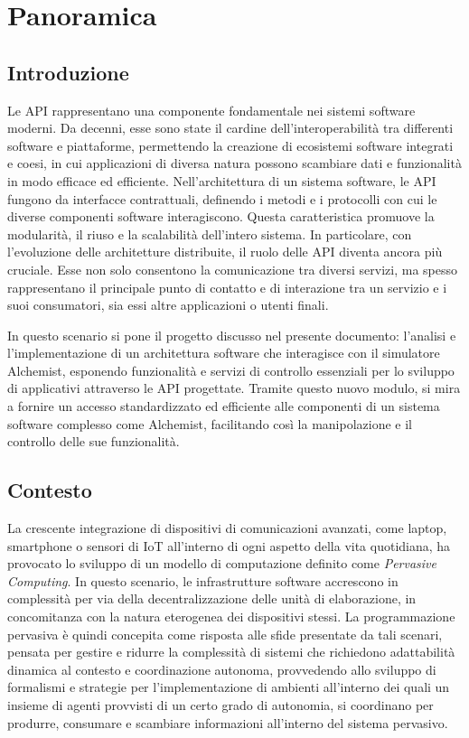 \chapter{Panoramica}\label{chap:introduction}
\section{Introduzione}\label{sec:background}
Le \ac{API} rappresentano una componente fondamentale nei sistemi software moderni. Da decenni, esse sono state il cardine dell'interoperabilità tra differenti software e piattaforme, permettendo la
creazione di ecosistemi software integrati e coesi, in cui applicazioni di diversa natura possono scambiare dati e funzionalità in modo efficace ed efficiente.
Nell'architettura di un sistema software, le \ac{API} fungono da interfacce contrattuali, definendo i metodi e i protocolli con cui le diverse componenti
software interagiscono. Questa caratteristica promuove la modularità, il riuso e la scalabilità dell'intero sistema. In particolare, con l'evoluzione delle
architetture distribuite, il ruolo delle \ac{API} diventa ancora più cruciale. Esse non solo consentono la comunicazione tra diversi servizi, ma spesso rappresentano il principale punto di
contatto e di interazione tra un servizio e i suoi consumatori, sia essi altre applicazioni o utenti finali.

In questo scenario si pone il progetto discusso nel presente documento: l'analisi e l'implementazione di un architettura software che interagisce con il simulatore Alchemist, esponendo funzionalità e
servizi di controllo essenziali per lo sviluppo di applicativi attraverso le API progettate.
Tramite questo nuovo modulo, si mira a fornire un accesso standardizzato ed efficiente alle componenti di un sistema software complesso come Alchemist, facilitando così la manipolazione e il controllo
delle sue funzionalità.

\section{Contesto}\label{sec:context}
La crescente integrazione di dispositivi di comunicazioni avanzati, come laptop, smartphone o sensori di \ac{IoT} all'interno
di ogni aspetto della vita quotidiana, ha provocato lo sviluppo di un modello di computazione definito come \textit{Pervasive Computing}.
In questo scenario, le infrastrutture software accrescono in complessità per via della decentralizzazione delle unità di elaborazione, in concomitanza
con la natura eterogenea dei dispositivi stessi. La programmazione pervasiva è quindi concepita come risposta alle sfide presentate da tali scenari,
pensata per gestire e ridurre la complessità di sistemi che richiedono adattabilità dinamica al contesto e coordinazione autonoma, provvedendo allo
sviluppo di formalismi e strategie per l'implementazione di ambienti all'interno dei quali un insieme di agenti provvisti di un certo grado di autonomia,
si coordinano per produrre, consumare e scambiare informazioni all'interno del sistema pervasivo.

